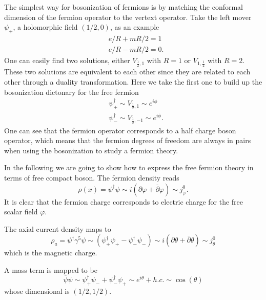 \documentclass[submission, PhysLectNotes]{SciPost}
\begin{document}
The simplest way for bosonization of fermions is by matching the conformal dimension of the fermion operator to the vertext operator. Take the left mover $\psi_{+}$, a holomorphic field $\left(1/2,0\right)$, as an example
\begin{equation}
	\begin{aligned}
		&e/R + mR/2 = 1\\
		&e/R - mR/2 = 0.
	\end{aligned}
\end{equation}
One can easily find two solutions, either $V_{\frac{1}{2},1}$ with $R=1$ or $V_{1,\frac{1}{2}}$ with $R=2$. These two solutions are equivalent to each other since they are related to each other through a duality transformation. Here we take the first one to build up the bosonization dictonary for the free fermion
\begin{equation}
	\begin{aligned}
		&\psi^{\dagger}_{+} \sim V_{\frac{1}{2},1} \sim e^{i \phi} \\
		&{\psi}^{\dagger}_{-} \sim V_{\frac{1}{2},-1} \sim e^{i\overline{\phi}}.
	\end{aligned}
\end{equation}
One can see that the fermion operator corresponds to a half charge boson operator, which means that the fermion degrees of freedom are always in pairs when using the bosonization to study a fermion theory. 

In the following we are going to show how to express the free fermion theory in terms of free compact boson. The fermion density reads
\begin{equation}
	\rho(x) = \psi^\dagger \psi \sim i \left(\partial \varphi + \overline{\partial} \varphi\right) \sim j^0_\varphi.
\end{equation}
It is clear that the fermion charge corresponds to electric charge for the free scalar field $\varphi$. 

The axial current density maps to 
\begin{equation}
	\rho_a = \psi^\dagger \gamma^5 \psi \sim \left( \psi^{\dagger}_{+} \psi_{+} - \psi^{\dagger}_{-}\psi_{-} \right) \sim i \left(\partial \theta + \overline{\partial} \theta\right) \sim j^0_\theta
\end{equation}
which is the magnetic charge. 

A mass term is mapped to be 
\begin{equation}
	\overline{\psi} \psi \sim \psi_{+}^\dagger \psi_{-} + \psi_{-}^\dagger \psi_{+} \sim e^{i\theta} + h.c. \sim \cos\left(\theta\right)
\end{equation}
whose dimensional is $\left(1/2,1/2\right)$.
\end{document}
